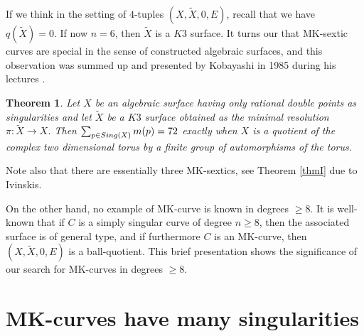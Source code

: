 \documentclass[11pt]{amsart}
\theoremstyle{plain}
\newtheorem{theorem}[thm]{Theorem}
\theoremstyle{definition}
\numberwithin{equation}{section}
\begin{document}
If we think in the setting of $4$-tuples $(X,\tilde{X},0,E)$, recall that we have $q(\tilde{X})=0$. If now $n=6$, then $\tilde{X}$ is a $K3$ surface. It turns our that MK-sextic curves are special in the sense of constructed algebraic surfaces, and this observation was summed up and presented by Kobayashi in 1985 during his lectures \cite{Koba}.

\begin{theorem} 
Let $X$ be an algebraic surface having only rational double points as singularities and let $\widetilde{X}$ be a $K3$ surface obtained as the  minimal resolution $\pi: \widetilde{X} \rightarrow X$. Then $\sum_{p \in {\rm Sing}(X)}m(p) = 72$ exactly when $X$ is a quotient of the complex two dimensional torus by a finite group of automorphisms of the torus. 
\end{theorem}
Note also that there are essentially three MK-sextics, see Theorem \ref{thmI} due to Ivinskis. 

On the other hand, no example of MK-curve is known in degrees $\geq 8$. It is well-known that if $C$ is a simply singular curve of degree $n\geq 8$, then the associated surface is of general type, and if furthermore $C$ is an MK-curve, then $(X,\tilde{X},0,E)$ is a ball-quotient. 
This brief presentation shows the significance of our search for  MK-curves  in degrees $\geq 8$. 

\section{MK-curves have many singularities}
\end{document}
